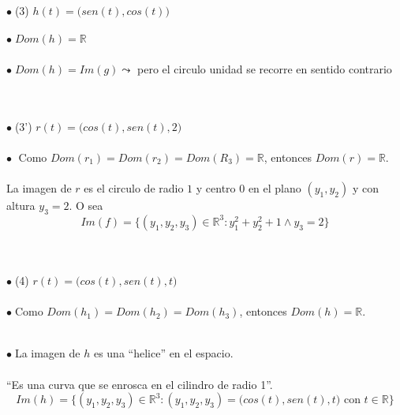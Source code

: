 \documentclass{article}
\theoremstyle{definition}
\theoremstyle{remark}
\newcommand\bl{$\bullet\;$}
\begin{document}
\begin{figure}[h]
\centering
\def\svgwidth{1\textwidth}

\end{figure}
\; \\\\ \bl \textcolor{verdep2}{(3)} $h(t)=\big(sen(t),cos(t)\big)$ \\ \\ 
\bl $Dom(h)=\mathbb{R}$ \\\\
\bl $Dom(h)=Im(g) \leadsto $ pero el circulo unidad se recorre en sentido contrario
\begin{figure}[h]
\centering
\def\svgwidth{1\textwidth}

\end{figure} \; \pagebreak
\; \\\\ \bl \textcolor{verdep2}{(3')} $r(t)=\big(cos(t),sen(t),2\big)$\\\\ \bl 
Como $Dom(r_1)=Dom(r_2)=Dom(R_3)=\mathbb{R}$, entonces $Dom (r)=\mathbb{R}$. \\\\ 
La imagen de $r$ es el circulo de radio $1$ y centro $0$ en el plano $(y_1,y_2)$ y con altura $y_3=2$. O sea \[ 
  Im(f)=\big\{(y_1,y_2,y_3)\in \mathbb{R}^3 : y_1^2+y_2^2+1 \land y_3=2\big\}
\] 
\begin{figure}[h]
\centering
\def\svgwidth{0.25\textwidth}

\end{figure}
\; \\\\ 
\bl \textcolor{verdep2}{(4)} $r(t)=\big(cos(t),sen(t),t\big)$\\\\ \bl  Como $Dom(h_1)=Dom(h_2)=Dom(h_3)$, entonces $Dom(h)=\mathbb{R}$. \\
\begin{figure}[h]
\centering
\def\svgwidth{1\textwidth}

\end{figure}\\
\bl La imagen de $h$ es una ``helice'' en el espacio. \\ \\ \phantom{\bl} ``Es una curva que se enrosca en el cilindro de radio 1''. \[
  Im(h)=\big\{(y_1,y_2,y_3) \in \mathbb{R}^3 : (y_1,y_2,y_3) = \big(cos(t),sen(t),t\big) \text{ con } t \in \mathbb{R}\big\}
  \]
\end{document}
